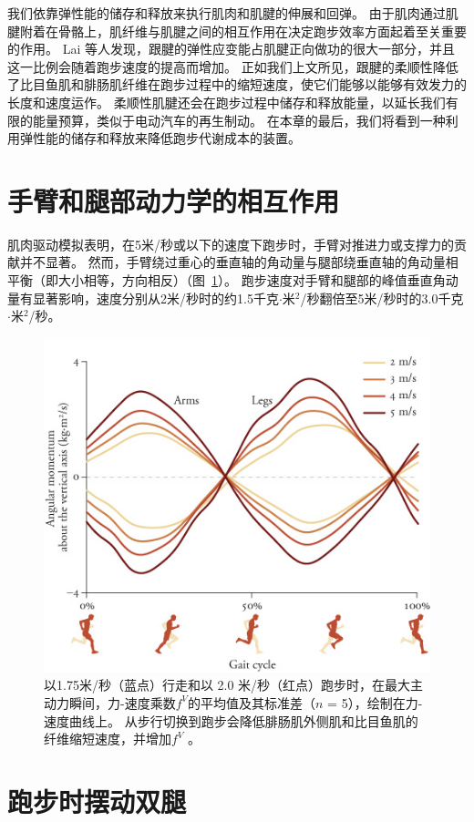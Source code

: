 我们依靠弹性能的储存和释放来执行肌肉和肌腱的伸展和回弹。
由于肌肉通过肌腱附着在骨骼上，肌纤维与肌腱之间的相互作用在决定跑步效率方面起着至关重要的作用。
Lai 等人\cite{lai2014tendon}发现，跟腱的弹性应变能占肌腱正向做功的很大一部分，并且这一比例会随着跑步速度的提高而增加。
正如我们上文所见，跟腱的柔顺性降低了比目鱼肌和腓肠肌纤维在跑步过程中的缩短速度，使它们能够以能够有效发力的长度和速度运作。
柔顺性肌腱还会在跑步过程中储存和释放能量，以延长我们有限的能量预算，类似于电动汽车的再生制动。
在本章的最后，我们将看到一种利用弹性能的储存和释放来降低跑步代谢成本的装置。


\section{手臂和腿部动力学的相互作用}

肌肉驱动模拟表明，在5米/秒或以下的速度下跑步时，手臂对推进力或支撑力的贡献并不显著。
然而，手臂绕过重心的垂直轴的角动量与腿部绕垂直轴的角动量相平衡（即大小相等，方向相反）（图~\ref{fig:12_7}）。
跑步速度对手臂和腿部的峰值垂直角动量有显著影响，速度分别从2米/秒时的约1.5千克$\cdot$米$^2$/秒翻倍至5米/秒时的3.0千克$\cdot$米$^2$/秒。


\begin{figure}[!htb]
	\centering
	\includegraphics[width=0.8\linewidth]{chap12/12_7}
	\caption{以1.75米/秒（蓝点）行走和以 2.0 米/秒（红点）跑步时，在最大主动力瞬间，力-速度乘数$f^V$的平均值及其标准差（$n$ = 5），绘制在力-速度曲线上。
		从步行切换到跑步会降低腓肠肌外侧肌和比目鱼肌的纤维缩短速度，并增加$f^V$ \cite{arnold2013muscle}。 \label{fig:12_7}}
\end{figure}


\section{跑步时摆动双腿}

